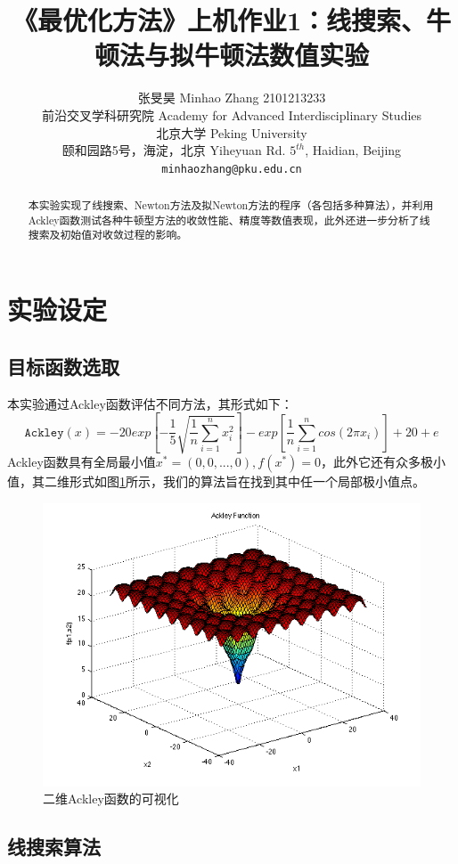 \documentclass{article}
\title{《最优化方法》上机作业1：线搜索、牛顿法与拟牛顿法数值实验}
\author{%
  张旻昊 Minhao Zhang 2101213233 \\
  前沿交叉学科研究院 Academy for Advanced Interdisciplinary Studies\\
  北京大学 Peking University\\
  颐和园路5号，海淀，北京 Yiheyuan Rd. $5^{th}$, Haidian, Beijing\\
  \texttt{minhaozhang@pku.edu.cn} \\
}
\begin{document}

\maketitle

\begin{abstract}
  本实验实现了线搜索、Newton方法及拟Newton方法的程序（各包括多种算法），并利用Ackley函数测试各种牛顿型方法的收敛性能、精度等数值表现，此外还进一步分析了线搜索及初始值对收敛过程的影响。
  
\end{abstract}

\section{实验设定}
\subsection{目标函数选取}
本实验通过Ackley函数评估不同方法，其形式如下：
\[ \texttt{Ackley}(x) = -20 exp[-\frac{1}{5} \sqrt{\frac{1}{n}\sum\limits_{i=1}^n x_i^2}] - exp[\frac{1}{n} \sum\limits_{i=1}^n cos(2\pi x_i)] + 20+e \]
Ackley函数具有全局最小值$x^* = (0,0,...,0), f(x^*)=0$，此外它还有众多极小值，其二维形式如图\ref{fig:ackley}所示，我们的算法旨在找到其中任一个局部极小值点。

\begin{figure}[h]
  \centering
  \includegraphics[width=.85\linewidth]{pics/ackley.png}
  \caption{二维Ackley函数的可视化}
  \label{fig:ackley}
\end{figure}

\subsection{线搜索算法}
\end{document}
